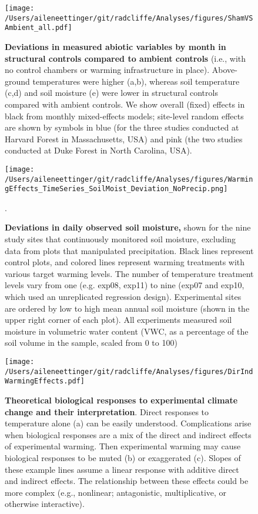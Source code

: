 \documentclass{article}
\begin{document}
 \begin{figure}[p]
\centering
 \texttt{[image: /Users/aileneettinger/git/radcliffe/Analyses/figures/ShamVSAmbient\_all.pdf]}  
 \caption{\textbf{Deviations in measured abiotic variables by month in structural controls compared to ambient controls} (i.e., with no control chambers or warming infrastructure in place). Above-ground temperatures were higher (a,b), whereas soil temperature (c,d) and soil moisture (e) were lower in structural controls compared with ambient controls. We show overall (fixed) effects in black from monthly mixed-effects models; site-level random effects are shown by symbols in blue (for the three studies conducted at Harvard Forest in Massachusetts, USA) and pink (the two studies conducted at Duke Forest in North Carolina, USA).}
 \label{fig:shamamb}
 \end{figure}
\clearpage
 \begin{figure}[h]
    \centering
 \texttt{[image: /Users/aileneettinger/git/radcliffe/Analyses/figures/WarmingEffects\_TimeSeries\_SoilMoist\_Deviation\_NoPrecip.png]}  
 \caption{\textbf{Deviations in daily observed soil moisture,} shown for the nine study sites that continuously monitored soil moisture, excluding data from plots that manipulated precipitation. Black lines represent control plots, and colored lines represent warming treatments with various target warming levels. The number of temperature treatment levels vary from one (e.g. exp08, exp11) to nine (exp07 and exp10, which used an unreplicated regression design).  Experimental sites are ordered by low to high mean annual soil moisture (shown in the upper right corner of each plot). All experiments measured soil moisture in volumetric water content (VWC, as a percentage of the soil volume in the sample, scaled from 0 to 100)}. 
 \label{fig:mois}
 \end{figure}
 
 \begin{figure}[h]
 \texttt{[image: /Users/aileneettinger/git/radcliffe/Analyses/figures/DirIndWarmingEffects.pdf]} 
 \caption{\textbf{Theoretical biological responses to experimental climate change and their interpretation}. Direct responses to temperature alone (a) can be easily understood. Complications arise when biological responses are a mix of the direct and indirect effects of experimental warming. Then experimental warming may cause biological responses to be muted (b) or exaggerated (c). Slopes of these example lines assume a linear response with additive direct and indirect effects. The relationship between these effects could be more complex (e.g., nonlinear; antagonistic, multiplicative, or otherwise interactive).} 
\label{fig:biolimp}
\end{figure}
\end{document}
